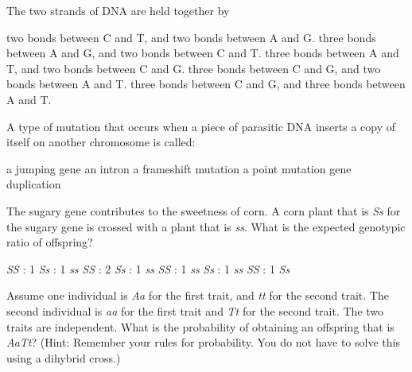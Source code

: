 \question
The two strands of DNA are held together by

\begin{choices}
\choice two bonds between C and T, and two bonds between A and G.%
\choice three bonds between A and G, and two bonds between C and T.%
\choice three bonds between A and T, and two bonds between C and G.%
\correctchoice three bonds between C and G, and two bonds between A and T.%
\choice three bonds between C and G, and three bonds between A and T.%
\end{choices}


\question
A type of mutation that occurs when a piece of parasitic DNA inserts a copy of itself on another chromosome is called:

\begin{choices}
\correctchoice a jumping gene%
\choice an intron%
\choice a frameshift mutation%
\choice a point mutation%
\choice gene duplication%
\end{choices}


\question
The sugary gene contributes to the sweetness of corn. A corn plant that is \textit{Ss} for the sugary gene is crossed with a plant that is \textit{ss}. What is the expected genotypic ratio of offspring?

\begin{choices}
 \textit{SS} : 1 \textit{Ss} : 1 \textit{ss}%
 \textit{SS} : 2 \textit{Ss} : 1 \textit{ss}%
 \textit{SS} : 1 \textit{ss}%
 \textit{Ss} : 1 \textit{ss}%
 \textit{SS} : 1 \textit{Ss}%
\end{choices}


\question
Assume one individual is \textit{Aa} for the first trait, and \textit{tt} for the second trait. The second individual is \textit{aa} for the first trait and \textit{Tt} for the second trait. The two traits are independent.  What is the probability of obtaining an offspring that is \textit{AaTt}? (Hint: Remember your rules for probability. You do not have to solve this using a dihybrid cross.)

\begin{choices}
\end{choices}


